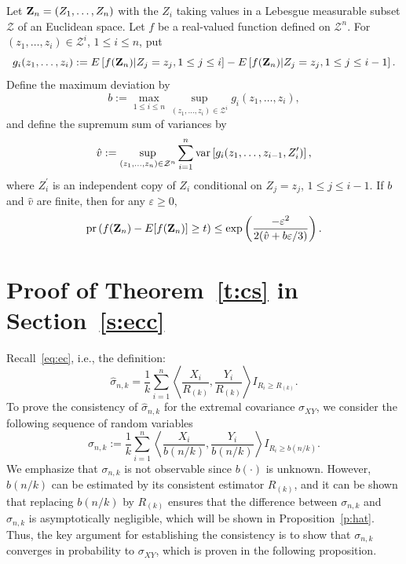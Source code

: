 \documentclass[lineno]{biometrika}
\newcommand \eg{\varepsilon}
\newcommand \sg{\sigma}
\newcommand\bZ{{\bf Z}}
\newcommand\cZ{{\mathcal Z}}
\newcommand\lp{\left (}
\newcommand\rp{\right )}
\newcommand\lb{\left [}
\newcommand\rb{\right ]}
\newcommand\lip{\left \langle}
\newcommand\rip{\right \rangle}
\newcommand\var{\hbox{\rm var}}
\begin{document}
\begin{lemma} \label{l:Bern}
Let $\bZ_n=(Z_1, \ldots, Z_n)$ with the $Z_i$ taking values in a
Lebesgue measurable subset $\cZ$ of an Euclidean space. Let $f$ be a real-valued function defined on $\cZ^n$. For $(z_1, \ldots, z_i) \in \cZ^{i}$, $1 \le i \le n$, put
\begin{equation} \label{eq:gi}
g_i(z_1, \ldots, z_i):=E\lb f(\bZ_n)| Z_j=z_j, 1 \le j \le i\rb -E\lb f(\bZ_n)| Z_j=z_j, 1 \le j \le i-1\rb.
\end{equation}
Define the maximum deviation by
\begin{equation} \label{eq:b}
b := \max_{1\le i\le n}\sup_{(z_1, \ldots, z_i) \in \cZ^i} g_i(z_1, \ldots, z_i),
\end{equation}
and define the supremum sum of variances by
\begin{equation} \label{eq:v}
\hat{v} := \sup_{(z_1, \ldots, z_n) \in \cZ^n} \sum_{i=1}^n \var\lb g_i(z_1, \ldots, z_{i-1}, Z_i^{\prime})\rb,
\end{equation}
where $Z_i^{\prime}$ is an independent copy of $Z_i$ conditional on $Z_j=z_j$, $1 \le j \le i-1$. If $b$ and $\hat{v}$ are finite, then for any $\eg \ge 0$,
\[
{\rm pr} \lp f(\bZ_n) - E[f(\bZ_n)] \ge t \rp \le \exp \lp \frac{-\eg^2}{2(\hat{v}+b\eg/3)}  \rp.
\]
\end{lemma}

\clearpage

\appendixtwo
\section{Proof of Theorem~\ref{t:cs} in Section~\ref{s:ecc}}\label{s:pr}

Recall~\eqref{eq:ec}, i.e., the definition:
\[
\hat{\sg}_{n,k} =\frac{1}{k}\sum_{i=1}^n \lip \frac{X_i}{R_{(k)}}, \frac{Y_i}{R_{(k)}} \rip I_{R_i \ge R_{(k)} }.
\]
To prove the consistency of $\hat{\sg}_{n,k}$ for the extremal covariance $\sg_{XY}$, we consider the following sequence of random variables
\begin{equation} \label{eq:sg}
\sg_{n,k} :=\frac{1}{k}\sum_{i=1}^n \lip \frac{X_i}{b(n/k)}, \frac{Y_i}{b(n/k)} \rip I_{R_i \ge b(n/k) }.
\end{equation}
We emphasize that $\sg_{n,k}$ is not observable since $b(\cdot)$ is unknown. However, $b(n/k)$ can be estimated by its consistent estimator $R_{(k)}$, and it can be shown that replacing $b(n/k)$ by $R_{(k)}$ ensures that the difference between $\sg_{n,k}$ and $\hat{\sg}_{n,k}$ is asymptotically negligible, which will be shown in Proposition~\ref{p:hat}. Thus, the key argument for establishing the consistency is to show that $\sg_{n,k}$ converges in probability to $\sg_{XY}$, which is proven in the following proposition.
\end{document}

